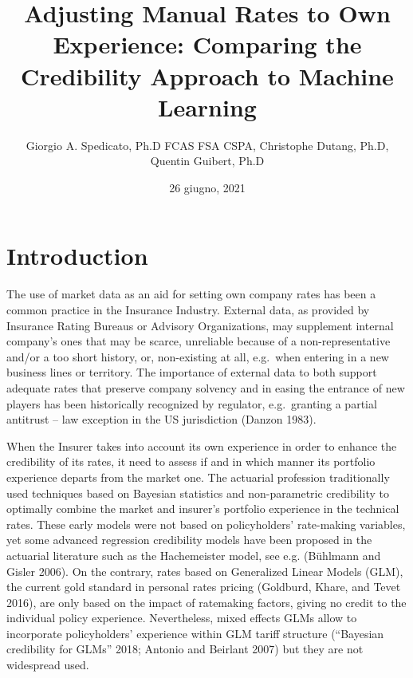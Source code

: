 \documentclass[
]{article}
\title{Adjusting Manual Rates to Own Experience: Comparing the
Credibility Approach to Machine Learning}
\author{Giorgio A. Spedicato, Ph.D FCAS FSA CSPA, Christophe Dutang,
Ph.D, Quentin Guibert, Ph.D}
\date{26 giugno, 2021}
\begin{document}
\maketitle

\hypertarget{introduction}{%
\section{Introduction}\label{introduction}}

The use of market data as an aid for setting own company rates has been
a common practice in the Insurance Industry. External data, as provided
by Insurance Rating Bureaus or Advisory Organizations, may supplement
internal company's ones that may be scarce, unreliable because of a
non-representative and/or a too short history, or, non-existing at all,
e.g.~when entering in a new business lines or territory. The importance
of external data to both support adequate rates that preserve company
solvency and in easing the entrance of new players has been historically
recognized by regulator, e.g.~granting a partial antitrust -- law
exception in the US jurisdiction (Danzon 1983).

When the Insurer takes into account its own experience in order to
enhance the credibility of its rates, it need to assess if and in which
manner its portfolio experience departs from the market one. The
actuarial profession traditionally used techniques based on Bayesian
statistics and non-parametric credibility to optimally combine the
market and insurer's portfolio experience in the technical rates. These
early models were not based on policyholders' rate-making variables, yet
some advanced regression credibility models have been proposed in the
actuarial literature such as the Hachemeister model, see e.g. (Bühlmann
and Gisler 2006). On the contrary, rates based on Generalized Linear
Models (GLM), the current gold standard in personal rates pricing
(Goldburd, Khare, and Tevet 2016), are only based on the impact of
ratemaking factors, giving no credit to the individual policy
experience. Nevertheless, mixed effects GLMs allow to incorporate
policyholders' experience within GLM tariff structure ({``{Bayesian
credibility for GLMs}''} 2018; Antonio and Beirlant 2007) but they are
not widespread used.
\end{document}
